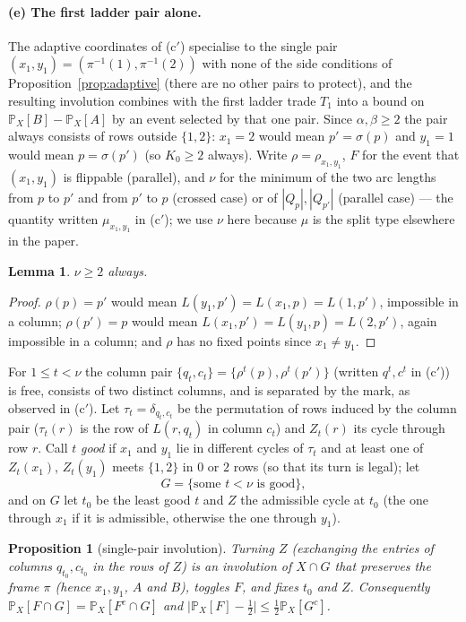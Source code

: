 \documentclass[11pt]{article}
\newtheorem{proposition}[theorem]{Proposition}
\newtheorem{lemma}[theorem]{Lemma}
\theoremstyle{definition}
\renewcommand{\Pr}{\mathbb{P}}
\begin{document}
\paragraph{(e) The first ladder pair alone.}  The adaptive coordinates of (c$'$)
specialise to the single pair $(x_1,y_1)=(\pi^{-1}(1),\pi^{-1}(2))$ with none of the side
conditions of Proposition~\ref{prop:adaptive} (there are no other pairs to protect), and
the resulting involution combines with the first ladder trade $T_1$ into a bound on
$\Pr_X[B]-\Pr_X[A]$ by an event selected by that one pair.  Since $\alpha,\beta\ge2$ the
pair always consists of rows outside $\{1,2\}$: $x_1=2$ would mean $p'=\sigma(p)$ and
$y_1=1$ would mean $p=\sigma(p')$ (so $K_0\ge2$ always).  Write $\rho=\rho_{x_1,y_1}$, $F$
for the event that $(x_1,y_1)$ is flippable (parallel), and $\nu$ for the minimum of the
two arc lengths from $p$ to $p'$ and from $p'$ to $p$ (crossed case) or of $|Q_p|,|Q_{p'}|$
(parallel case) --- the quantity written $\mu_{x_1,y_1}$ in (c$'$); we use $\nu$ here
because $\mu$ is the split type elsewhere in the paper.

\begin{lemma}\label{lem:mu2}
$\nu\ge2$ always.
\end{lemma}
\begin{proof}
$\rho(p)=p'$ would mean $L(y_1,p')=L(x_1,p)=L(1,p')$, impossible in a column; $\rho(p')=p$
would mean $L(x_1,p')=L(y_1,p)=L(2,p')$, again impossible in a column; and $\rho$ has no
fixed points since $x_1\ne y_1$.
\end{proof}

For $1\le t<\nu$ the column pair $\{q_t,c_t\}=\{\rho^t(p),\rho^t(p')\}$ (written
$q^t,c^t$ in (c$'$)) is free, consists of two distinct columns, and is separated by the
mark, as observed in (c$'$).  Let $\tau_t=\delta_{q_t,c_t}$ be the permutation of rows
induced by the column pair ($\tau_t(r)$ is the row of $L(r,q_t)$ in column $c_t$) and
$Z_t(r)$ its cycle through row $r$.  Call $t$ \emph{good} if $x_1$ and
$y_1$ lie in different cycles of $\tau_t$ and at least one of $Z_t(x_1)$, $Z_t(y_1)$ meets
$\{1,2\}$ in $0$ or $2$ rows (so that its turn is legal); let
\[
G=\{\text{some }t<\nu\text{ is good}\},
\]
and on $G$ let $t_0$ be the least good $t$ and $Z$ the admissible cycle at $t_0$ (the one
through $x_1$ if it is admissible, otherwise the one through $y_1$).

\begin{proposition}[single-pair involution]\label{prop:firstpair}
Turning $Z$ (exchanging the entries of columns $q_{t_0},c_{t_0}$ in the rows of $Z$) is an
involution of $X\cap G$ that preserves the frame $\pi$ (hence $x_1,y_1$, $A$ and $B$),
toggles $F$, and fixes $t_0$ and $Z$.  Consequently
$\Pr_X[F\cap G]=\Pr_X[F^c\cap G]$ and
$\bigl|\Pr_X[F]-\tfrac12\bigr|\le\tfrac12\Pr_X[G^c]$.
\end{proposition}
\end{document}
